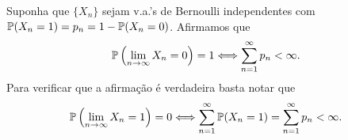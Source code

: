 \begin{exemplo}[Continuação]
	Suponha que $\{X_n\}$ sejam v.a.'s de Bernoulli 
	independentes com $\P(X_n=1)=p_n=1-\P(X_n=0)$. 
	Afirmamos que  
		\[
			\P\left( \lim_{n\to\infty} X_n=0\right)=1
			\Longleftrightarrow
			\sum_{n=1}^{\infty}p_n<\infty.
		\]
	Para verificar que a afirmação é verdadeira
	basta notar que 
	\[
		\P\left( \lim_{n\to\infty} X_n=1\right)=0
		\Longleftrightarrow
		\sum_{n=1}^{\infty} \P(X_n=1)
		=		
		\sum_{n=1}^{\infty}p_n<\infty.
	\]
\end{exemplo}









